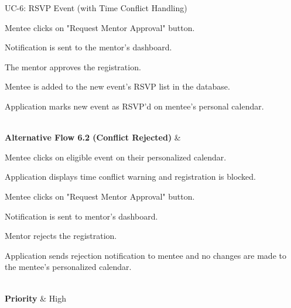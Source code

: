 \begin{usecase}{UC-6: RSVP Event (with Time Conflict Handling)}
\begin{tabenum}
        \item Mentee clicks on "Request Mentor Approval" button.
        \item Notification is sent to the mentor's dashboard.
        \item The mentor approves the registration.
        \item Mentee is added to the new event's RSVP list in the database.
        \item Application marks new event as RSVP'd on mentee's personal calendar.
    \end{tabenum}                                                                \\ \hline
    \textbf{%
        Alternative Flow 6.2
        (Conflict Rejected)%
    }                       & 
    \begin{tabenum}
        \item Mentee clicks on eligible event on their personalized calendar.
        \item Application displays time conflict warning and registration is blocked.
        \item Mentee clicks on "Request Mentor Approval" button.
        \item Notification is sent to mentor's dashboard.
        \item Mentor rejects the registration.
        \item Application sends rejection notification to mentee and no changes are made to the mentee's personalized calendar.
    \end{tabenum}                                                                \\ \hline
    \textbf{Priority}       & High                                               \\
\end{usecase}

